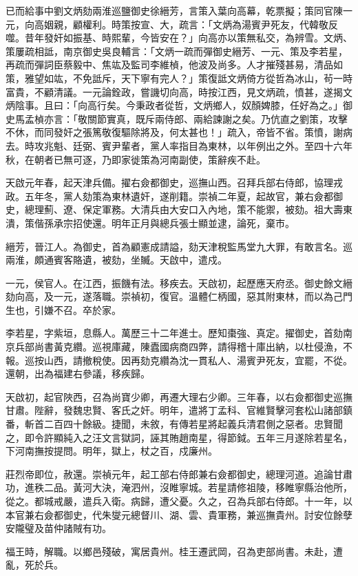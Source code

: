 \begin{pinyinscope}
已而給事中劉文炳劾兩淮巡鹽御史徐縉芳，言策入葉向高幕，乾票擬；策同官陳一元，向高姻親，顧權利。時策按宣、大，疏言：「文炳為湯賓尹死友，代韓敬反噬。昔年發奸如振基、時熙輩，今皆安在？」向高亦以策無私交，為辨雪。文炳、策屢疏相詆，南京御史吳良輔言：「文炳一疏而彈御史縉芳、一元、策及李若星，再疏而彈詞臣蔡毅中、焦竑及監司李維楨，他波及尚多。人才摧殘甚易，清品如策，雅望如竑，不免詆斥，天下寧有完人？」策復詆文炳倚方從哲為冰山，茍一時富貴，不顧清議。一元論銓政，嘗譏切向高，時按江西，見文炳疏，憤甚，遂揭文炳陰事。且曰：「向高行矣。今秉政者從哲，文炳鄉人，奴顏婢膝，任好為之。」御史馬孟楨亦言：「敬關節實真，既斥兩侍郎、兩給諫謝之矣。乃伉直之劉策，攻擊不休，而同發奸之張篤敬復驅除將及，何太甚也！」疏入，帝皆不省。策憤，謝病去。時攻兆魁、廷弼、賓尹輩者，黨人率指目為東林，以年例出之外。至四十六年秋，在朝者已無可逐，乃即家徙策為河南副使，策辭疾不赴。

天啟元年春，起天津兵備。擢右僉都御史，巡撫山西。召拜兵部右侍郎，協理戎政。五年冬，黨人劾策為東林遺奸，遂削籍。崇禎二年夏，起故官，兼右僉都御史，總理薊、遼、保定軍務。大清兵由大安口入內地，策不能禦，被劾。祖大壽東潰，策偕孫承宗招使還。明年正月與總兵張士顯並逮，論死，棄市。

縉芳，晉江人。為御史，首為顧憲成請謚，劾天津稅監馬堂九大罪，有敢言名。巡兩淮，頗通賓客賂遺，被劾，坐贓。天啟中，遣戍。

一元，侯官人。在江西，振饑有法。移疾去。天啟初，起歷應天府丞。御史餘文縉劾向高，及一元，遂落職。崇禎初，復官。溫體仁柄國，惡其附東林，而以為己門生也，引嫌不召。卒於家。

李若星，字紫垣，息縣人。萬歷三十二年進士。歷知棗強、真定。擢御史，首劾南京兵部尚書黃克纘。巡視庫藏，陳蠹國病商四弊，請得稽十庫出納，以杜侵漁，不報。巡按山西，請撤稅使。因再劾克纘為沈一貫私人、湯賓尹死友，宜罷，不從。還朝，出為福建右參議，移疾歸。

天啟初，起官陜西，召為尚寶少卿，再遷大理右少卿。三年春，以右僉都御史巡撫甘肅。陛辭，發魏忠賢、客氏之奸。明年，遣將丁孟科、官維賢擊河套松山諸部鎮番，斬首二百四十餘級。捷聞，未敘，有傳若星將起義兵清君側之惡者。忠賢聞之，即令許顯純入之汪文言獄詞，誣其賄趙南星，得節鉞。五年三月遂除若星名，下河南撫按提問。明年，獄上，杖之百，戍廉州。

莊烈帝即位，赦還。崇禎元年，起工部右侍郎兼右僉都御史，總理河道。追論甘肅功，進秩二品。黃河大決，淹泗州，沒睢寧城。若星請修祖陵，移睢寧縣治他所，從之。都城戒嚴，遣兵入衛。病歸，遭父憂。久之，召為兵部右侍郎。十一年，以本官兼右僉都御史，代朱燮元總督川、湖、雲、貴軍務，兼巡撫貴州。討安位餘孽安隴璧及苗仲諸賊有功。

福王時，解職。以鄉邑殘破，寓居貴州。桂王遷武岡，召為吏部尚書。未赴，遭亂，死於兵。


\end{pinyinscope}
